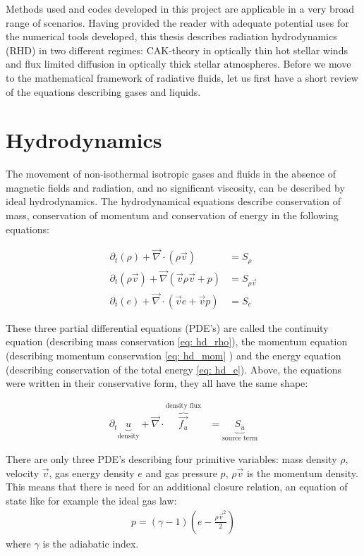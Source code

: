 Methods used and codes developed in this project are applicable in a very broad range of scenarios. Having provided the reader with adequate potential uses for the numerical tools developed, this thesis describes radiation hydrodynamics (RHD) in two different regimes: CAK-theory in optically thin hot stellar winds and flux limited diffusion in optically thick stellar atmospheres. Before we move to the mathematical framework of radiative fluids, let us first have a short review of the equations describing gases and liquids.\\

\section{Hydrodynamics}
The movement of non-isothermal isotropic gases and fluids in the absence of magnetic fields and radiation, and no significant viscosity, can be described by ideal hydrodynamics. The hydrodynamical equations describe conservation of mass, conservation of momentum and conservation of energy in the following equations:

\begin{align}
 \partial_t \left(\rho \right) + \vec{\nabla} \cdot \left( \rho \vec{v}  \right) &= S_\rho \label{eq: hd_rho}\\
 \partial_t \left(\rho \vec{v} \right) + \vec{\nabla} \left( \vec{v} \rho \vec{v} + p \right) &= S_{\rho \vec{v}} \label{eq: hd_mom}\\
 \partial_t \left(e \right) + \vec{\nabla} \cdot \left( \vec{v} e + \vec{v} p \right) &= S_e \label{eq: hd_e}
\end{align}

These three partial differential equations (PDE's) are called the continuity equation (describing mass conservation \eqref{eq: hd_rho}), the momentum equation (describing momentum conservation \eqref{eq: hd_mom} ) and the energy equation (describing conservation of the total energy \eqref{eq: hd_e}). Above, the equations were written in their conservative form, they all have the same shape:

\begin{align}
	\partial_t \underbrace{u}_\text{density} + \vec{\nabla} \cdot \overbrace{\vec{f_u}}^\text{density flux} &= \underbrace{S_u}_\text{source term} \label{eq: conservative}
\end{align}

There are only three PDE's describing four primitive variables: mass density $\rho$, velocity $\vec{v}$, gas energy density $e$ and gas pressure $p$, $\rho \vec{v}$ is the momentum density. This means that there is need for an additional closure relation, an equation of state like for example the ideal gas law:
\begin{align}
	p = (\gamma - 1) \left(e - \frac{\rho \vec{v}^2}{2} \right) \label{gas_closing}
\end{align}
where $\gamma$ is the adiabatic index.\\

